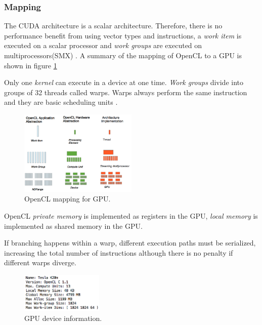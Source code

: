 \subsubsection{Mapping}
\par{The CUDA architecture is a scalar architecture. Therefore, there is no 
    performance benefit from using vector types and 
    instructions, a \emph{work item} is executed on a scalar processor and 
    \emph{work groups} are executed on multiprocessors(SMX)
    \cite{gpu_opencl_cuda,gpu_opencl_opt_slides}. A summary of the mapping of
    OpenCL to a GPU is shown in figure \ref{GpuModel}}

\par{Only one \emph{kernel} can execute in a device at one time. 
    \emph{Work groups} divide into groups of 32 threads called warps. 
    Warps always perform the same instruction and they are basic scheduling 
    units \cite{gpu_opencl_opt_slides}.}

\begin{figure}[!h]
    \centering
    \includegraphics[width=0.5\textwidth]{figures/gpu_model.png}
    \caption{OpenCL mapping for GPU.}
    \label{GpuModel}
\end{figure}


\par{OpenCL \emph{private memory} is implemented as registers in the GPU, \emph{local memory} is implemented as shared memory 
    in the GPU\cite{gpu_opencl_opt_slides}.}

\par{If branching happens within a warp, different execution paths must be serialized, increasing the total number of 
    instructions although there is no penalty if different warps diverge\cite{gpu_opencl_opt_slides}.}

\begin{figure}[!h]
    \centering
    \includegraphics[width=0.35\textwidth]{figures/gpu_device_info.png}
    \caption{GPU device information.}
    \label{GpuDeviceInfo}
\end{figure}

